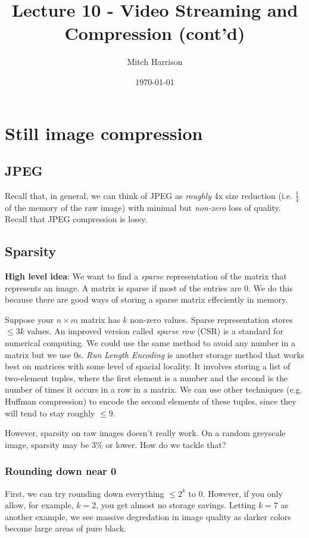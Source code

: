 \documentclass[titlepage, 12pt, leqno]{article}
\title{\Huge{Lecture 10 - Video Streaming and Compression (cont'd)}}
\author{\large{Mitch Harrison}}
\date{\today}
\begin{document}
\setlength{\parskip}{1\baselineskip}
\setlength{\parindent}{15pt}
\maketitle
\tableofcontents
\newpage


\section{Still image compression}
\subsection{JPEG}

Recall that, in general, we can think of JPEG as \textit{roughly} 4x size 
reduction (i.e. $\frac{1}{4}$ of the memory of the raw image) with minimal but 
\textit{non-zero} loss of quality. Recall that JPEG compression is lossy.

\subsection{Sparsity}
\textbf{High level idea}: We want to find a \textit{sparse} representation of the
matrix that represents an image. A matrix is sparse if most of the entries are 0.
We do this because there are good ways of storing a sparse matrix effeciently in
memory.

Suppose your $n\times m$ matrix has $k$ non-zero values. Sparse representation
stores $\le 3k$ values. An improved version called \textit{sparse row} (CSR) is
a standard for numerical computing. We could use the same method to avoid any 
number in a matrix but we use 0s. \textit{Run Length Encoding} is another storage
method that works best on matrices with some level of spacial locality. It 
involves storing a list of two-element tuples, where the first element is a number
and the second is the number of times it occurs in a row in a matrix. We can 
use other techniques (e.g. Huffman compression) to encode the second elements of
these tuples, since they will tend to stay roughly $\le 9$.

However, sparsity on raw images doesn't really work. On a random greyscale image,
sparsity may be 3\% or lower. How do we tackle that? 

\subsubsection{Rounding down near 0}
First, we can try rounding down everything $\le 2^{k}$ to 0. However, if you only
allow, for example, $k=2$, you get almost no storage savings. Letting $k=7$ as
another example, we see massive degredation in image quality as darker colors
become large areas of pure black.
\end{document}
